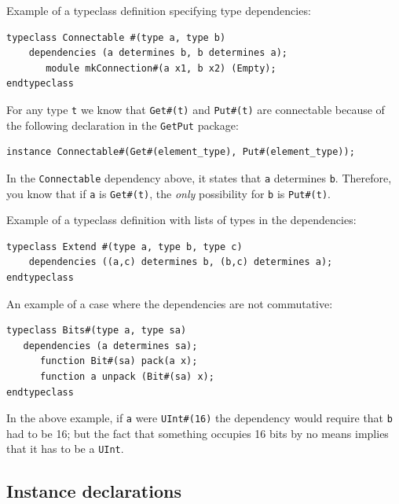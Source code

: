 \documentclass[twoside,letterpaper]{article}
\newcommand{\te}[1]{\texttt{#1}}
\begin{document}
Example of a typeclass definition specifying type dependencies:
\begin{verbatim}
typeclass Connectable #(type a, type b)
    dependencies (a determines b, b determines a);
       module mkConnection#(a x1, b x2) (Empty);
endtypeclass
\end{verbatim}

For any type \texttt{t} we know that \texttt{Get\#(t)}
and \texttt{Put\#(t)} are connectable because of the following
declaration in the \te{GetPut} package: 
\begin{verbatim}
instance Connectable#(Get#(element_type), Put#(element_type));
\end{verbatim}

In the \te{Connectable} dependency above, it states that \te{a}
determines \te{b}.  Therefore, you know
that if \te{a} is \te{Get\#(t)}, the \emph{only} possibility for \te{b} is
 \te{Put\#(t)}.



Example of a typeclass definition with lists of types in the dependencies:
\begin{verbatim}
typeclass Extend #(type a, type b, type c)
    dependencies ((a,c) determines b, (b,c) determines a); 
endtypeclass
\end{verbatim}


An example of a case where the dependencies are not commutative:
\begin{verbatim}
typeclass Bits#(type a, type sa)
   dependencies (a determines sa);
      function Bit#(sa) pack(a x);
      function a unpack (Bit#(sa) x);
endtypeclass
\end{verbatim}
In the above example, if \te{a} were \te{UInt\#(16)} the dependency
would require that \te{b} had to be 16; but the fact that something
occupies 16 bits by no means implies that it has to be a \te{UInt}.



\subsection{Instance declarations}

\label{sec-instance-def}

\index{type classes!\te{instance}}
\end{document}
